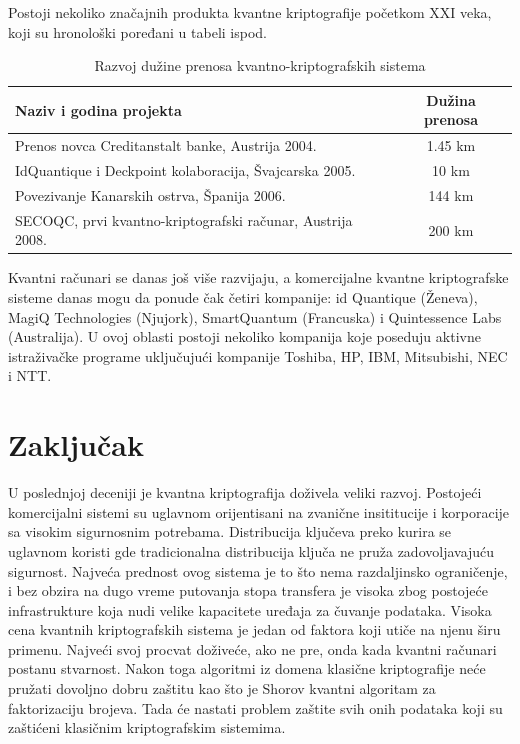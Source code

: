 \documentclass[a4paper]{article}
\begin{document}
{Postoji nekoliko značajnih produkta kvantne kriptografije početkom XXI veka, koji su hronološki poređani u tabeli ispod.
\\
\begin{table}[h]
\centering
\begin{adjustbox}{width=\columnwidth,center}
\begin{tabular}{|l|c|}
\hline
\textbf{Naziv i godina projekta}                           & \textbf{Dužina prenosa} \\ \hline
Prenos novca Creditanstalt banke, Austrija 2004.           & 1.45 km                 \\ \hline
IdQuantique i Deckpoint kolaboracija, Švajcarska 2005.     & 10 km                   \\ \hline
Povezivanje Kanarskih ostrva, Španija 2006.                & 144 km                  \\ \hline
SECOQC, prvi kvantno-kriptografski računar, Austrija 2008. & 200 km                  \\ \hline
\end{tabular}
\end{adjustbox}
\caption{Razvoj dužine prenosa kvantno-kriptografskih sistema}

\label{tabela:kvantnaxxii}
\end{table}

Kvantni računari se danas još više razvijaju, a komercijalne kvantne kriptografske sisteme danas mogu da ponude čak četiri kompanije: id Quantique (Ženeva), MagiQ Technologies (Njujork), SmartQuantum (Francuska) i Quintessence Labs (Australija). U ovoj oblasti postoji nekoliko kompanija koje poseduju aktivne istraživačke programe uključujući kompanije Toshiba, HP, IBM, Mitsubishi, NEC i NTT. 

\section{Zaključak}
\label{sec:zakljucak}

U poslednjoj deceniji je kvantna kriptografija doživela veliki razvoj. Postojeći komercijalni sistemi su uglavnom orijentisani na zvanične insititucije i korporacije sa visokim sigurnosnim potrebama. Distribucija ključeva preko kurira se uglavnom koristi gde tradicionalna distribucija ključa ne pruža zadovoljavajuću sigurnost. Najveća prednost ovog sistema je to što nema razdaljinsko ograničenje, i bez obzira na dugo vreme putovanja stopa transfera je visoka zbog postojeće infrastrukture koja nudi velike kapacitete uređaja za čuvanje podataka. Visoka cena kvantnih kriptografskih sistema je jedan od faktora koji utiče na njenu širu primenu. Najveći svoj procvat doživeće, ako ne pre, onda kada kvantni računari postanu stvarnost. Nakon toga algoritmi iz domena klasične kriptografije neće pružati dovoljno dobru zaštitu kao što je Shorov kvantni algoritam za faktorizaciju brojeva. Tada će nastati problem zaštite svih onih podataka koji su zaštićeni klasičnim kriptografskim sistemima.

}
\end{document}
